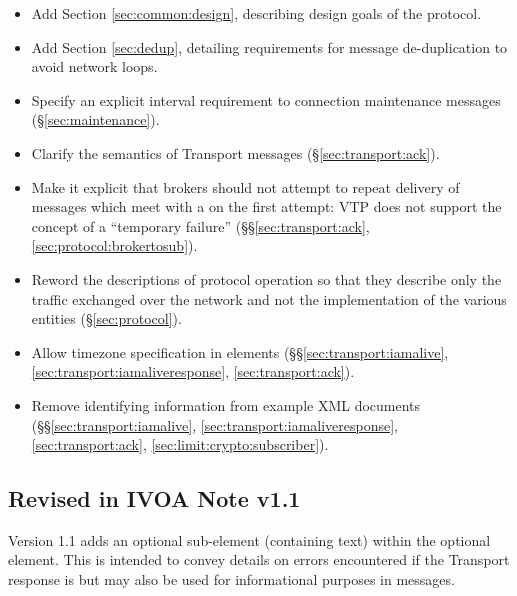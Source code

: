 \documentclass[a4paper,11pt]{ivoa}
\begin{document}
\begin{itemize}
    \item{Add Section \ref{sec:common:design}, describing design goals of the
    protocol.}

    \item{Add Section \ref{sec:dedup}, detailing requirements for message
    de-duplication to avoid network loops.}

    \item{Specify an explicit interval requirement to connection maintenance
    messages (\S\ref{sec:maintenance}).}

    \item{Clarify the semantics of  Transport messages
    (\S\ref{sec:transport:ack}).}

    \item{Make it explicit that brokers should not attempt to repeat delivery
    of messages which meet with a  on the first attempt: VTP does
    not support the concept of a ``temporary failure''
    (\S\S\ref{sec:transport:ack}, \ref{sec:protocol:brokertosub}).}

    \item{Reword the descriptions of protocol operation so that they describe
    only the traffic exchanged over the network and not the implementation of
    the various entities (\S\ref{sec:protocol}).}

    \item{Allow timezone specification in 
     elements (\S\S\ref{sec:transport:iamalive},
    \ref{sec:transport:iamaliveresponse}, \ref{sec:transport:ack}).}

    \item{Remove identifying information from example XML documents
    (\S\S\ref{sec:transport:iamalive}, \ref{sec:transport:iamaliveresponse},
    \ref{sec:transport:ack}, \ref{sec:limit:crypto:subscriber}).}
\end{itemize}

\subsection{Revised in IVOA Note v1.1}

Version 1.1 adds an optional  sub-element (containing text)
within the optional  element. This is intended to convey
details on errors encountered if the Transport response is  but
may also be used for informational purposes in  messages.


\end{document}
